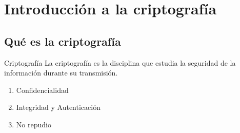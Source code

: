 \documentclass[10pt,t]{beamer}
\begin{document}
\section{Introducción a la criptografía}

\subsection{Qué es la criptografía}

\begin{frame}
    \begin{block}{\centering \large Criptografía}
        \centering
        La criptografía es la disciplina que estudia la seguridad de la información durante su transmisión.
    \end{block}

    \begin{prop}
        \begin{enumerate}[label=--]
            \item Confidencialidad
            \item Integridad y Autenticación
            \item No repudio
        \end{enumerate}
    \end{prop}

    \vspace{1em}

    \begin{center}
    \end{center}
\end{frame}
\end{document}
